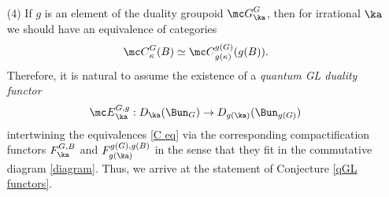 \documentclass[11pt,reqno]{amsart}
\theoremstyle{plain}
\numberwithin{equation}{section}
\theoremstyle{definition}
\begin{document}
\begin{itemize}
\bigskip

\item[(4)] If $g$ is an element of the duality groupoid ${\mc
    G}^G_\ka$, then for irrational $\ka$ we should have an equivalence of
  categories
\begin{equation}    \label{C eq}
{\mc C}^G_\kappa(B) \simeq {\mc C}^{g(G)}_{g(\kappa)}(g(B)).
\end{equation}
Therefore, it is natural to assume the existence of a {\em quantum GL
  duality functor}
\begin{equation}    \label{qGLf}
{\mc E}^{G,g}_\ka: D_\ka(\Bun_G) \to
  D_{g(\ka)}(\Bun_{g(G)})
\end{equation}
intertwining the equivalences \eqref{C eq} via the corresponding
compactification functors $F^{G,B}_\ka$ and $F^{g(G),g(B)}_{g(\ka)}$
in the sense that they fit in the commutative diagram
\eqref{diagram}. Thus, we arrive at the statement of Conjecture
\ref{qGL functors}.

\end{itemize}

\medskip
\end{document}
